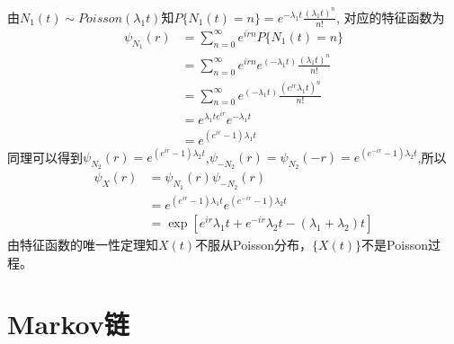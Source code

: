 \begin{enumerate}
	      由\(N_1(t)\sim Poisson(\lambda_1t)\)知\(P\{N_1(t)=n\}=e^{-\lambda_1t}\frac{(\lambda_1t)^n}{n!}\),
	      对应的特征函数为
	      \begin{align*}
		      \psi_{N_1}(r)
		       & =\sum_{n=0}^{\infty}e^{irn}P\{N_1(t)=n\}                                \\
		       & =\sum_{n=0}^{\infty}e^{irn}e^{(-\lambda_1 t)}\frac{(\lambda_1 t)^n}{n!} \\
		       & =\sum_{n=0}^{\infty}e^{(-\lambda_1 t)}\frac{(e^{ir}\lambda_1 t)^n}{n!}  \\
		       & =e^{\lambda_1 t e^{ir}}e^{-\lambda_1 t}                                 \\
		       & =e^{(e^{ir}-1)\lambda_1 t}
	      \end{align*}
	      同理可以得到\(\psi_{N_2}(r)=e^{(e^{ir}-1)\lambda_2 t}\),\(\psi_{-N_2}(r)=\psi_{N_2}(-r)=e^{(e^{-ir}-1)\lambda_2 t}\),所以
	      \begin{align*}
		      \psi_{X}(r)
		       & =\psi_{N_1}(r)\psi_{-N_2}(r)                                                   \\
		       & =e^{(e^{ir}-1)\lambda_1 t}e^{(e^{-ir}-1)\lambda_2 t}                           \\
		       & =\exp\left[e^{ir}\lambda_1 t+e^{-ir} \lambda_2 t-(\lambda_1+\lambda_2)t\right]
	      \end{align*}
	      由特征函数的唯一性定理知\(X(t)\)不服从Poisson分布，\(\{X(t)\}\)不是Poisson过程。
\end{enumerate}

\section{Markov链}

